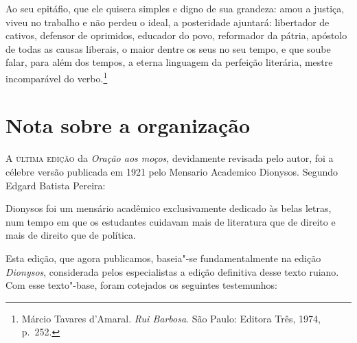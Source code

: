 \begin{hedraquote}
Ao seu epitáfio, que ele quisera simples e digno de sua
grandeza: amou a justiça, viveu no trabalho e não perdeu o ideal, a
posteridade ajuntará: libertador de cativos, defensor de oprimidos,
educador do povo, reformador da pátria, apóstolo de todas as causas
liberais, o maior dentre os seus no seu tempo, e que soube falar, para
além dos tempos, a eterna linguagem da perfeição literária, mestre
incomparável do verbo.\footnote{ Márcio Tavares d'Amaral. \textit{Rui Barbosa}. 
São Paulo: Editora Três, 1974, p.~252.}
\end{hedraquote}


\chapter[Nota sobre a organização, \emph{por Marcelo Módolo}]{Nota sobre a organização}
\vskip-1cm


\textsc{A última edição} da \textit{Oração aos moços}, 
devidamente revisada pelo autor, foi a célebre versão
publicada em 1921 pelo Mensario Academico Dionysos. Segundo Edgard
Batista Pereira: 

\begin{hedraquote}
Dionysos foi um mensário acadêmico exclusivamente dedicado às belas 
letras, num tempo em que os estudantes cuidavam mais de literatura 
que de direito e mais de direito que de política.
\end{hedraquote}

Esta edição, que agora publicamos, baseia"-se fundamentalmente na edição
\textit{Dionysos}, considerada pelos especialistas a edição
definitiva desse texto ruiano. Com esse texto"-base, foram cotejados os
seguintes testemunhos: 

